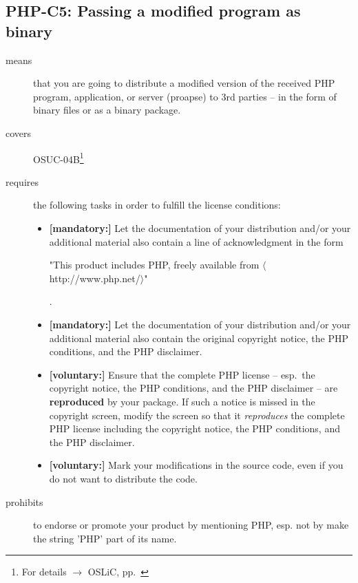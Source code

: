 \subsection{PHP-C5: Passing a modified program as binary}
\label{OSUC-04B-PHP}

\begin{description}
\item[means] that you are going to distribute a modified version of the received
PHP pro\-gram, application, or server (proapse) to 3rd parties -- in the form of
binary files or as a binary package.
\item[covers] OSUC-04B\footnote{For details $\rightarrow$ OSLiC, pp.\
\pageref{OSUC-04B-DEF}}
\item[requires] the following tasks in order to fulfill the license conditions:
\begin{itemize}
  
  \item \textbf{[mandatory:]} Let the documentation of your distribution and/or
  your additional material also contain a line of acknowledgment in the form
  \begin{footnotesize}"This product includes PHP, freely available from
  $\langle$http://www.php.net/$\rangle$"\end{footnotesize}.
    
  \item \textbf{[mandatory:]} Let the documentation of your distribution and/or
  your additional material also contain the original copyright notice, the PHP
  conditions, and the PHP disclaimer.

  \item \textbf{[voluntary:]} Ensure that the complete PHP license -- esp.\ the
  copyright notice, the PHP conditions, and the PHP disclaimer -- are
  \textbf{reproduced} by your package. If such a notice is missed in the
  copyright screen, modify the screen so  that it \emph{reproduces} the complete
  PHP license including the copyright notice, the PHP conditions, and the PHP
  disclaimer.
  
  \item \textbf{[voluntary:]} Mark your modifications in the source code,
  even if you do not want to distribute the code.

\end{itemize}

\item[prohibits] to endorse or promote your product by mentioning PHP, esp. not
by make the string 'PHP' part of its name.

\end{description}

